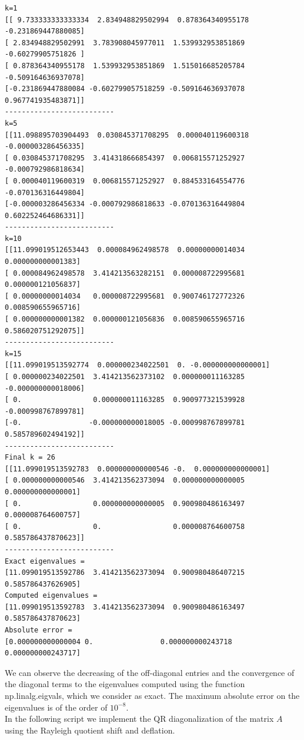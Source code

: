 \documentclass[a4paper,11pt]{article}
\begin{document}
\begin{verbatim}
k=1
[[ 9.733333333333334  2.834948829502994  0.878364340955178 -0.231869447880085]
[ 2.834948829502991  3.783908045977011  1.539932953851869 -0.60279905751826 ]
[ 0.878364340955178  1.539932953851869  1.515016685205784 -0.509164636937078]
[-0.231869447880084 -0.602799057518259 -0.509164636937078  0.967741935483871]]
--------------------------
k=5
[[11.098895703904493  0.030845371708295  0.000040119600318 -0.000003286456335]
[ 0.030845371708295  3.414318666854397  0.006815571252927 -0.000792986818634]
[ 0.000040119600319  0.006815571252927  0.884533164554776 -0.070136316449804]
[-0.000003286456334 -0.000792986818633 -0.070136316449804  0.602252464686331]]
--------------------------
k=10
[[11.099019512653443  0.000084962498578  0.00000000014034  0.000000000001383]
[ 0.000084962498578  3.414213563282151  0.000008722995681  0.000000121056837]
[ 0.00000000014034   0.000008722995681  0.900746172772326  0.008590655965716]
[ 0.000000000001382  0.000000121056836  0.008590655965716  0.586020751292075]]
--------------------------
k=15
[[11.099019513592774  0.000000234022501  0. -0.000000000000001]
[ 0.000000234022501  3.414213562373102  0.000000011163285 -0.000000000018006]
[ 0.                 0.000000011163285  0.900977321539928 -0.000998767899781]
[-0.                -0.000000000018005 -0.000998767899781  0.585789602494192]]
--------------------------
Final k = 26
[[11.099019513592783  0.000000000000546 -0.  0.000000000000001]
[ 0.000000000000546  3.414213562373094  0.000000000000005  0.000000000000001]
[ 0.                 0.000000000000005  0.900980486163497  0.000008764600757]
[ 0.                 0.                 0.000008764600758  0.585786437870623]]
--------------------------
Exact eigenvalues = 
[11.099019513592786  3.414213562373094  0.900980486407215  0.585786437626905]
Computed eigenvalues =
[11.099019513592783  3.414213562373094  0.900980486163497  0.585786437870623]
Absolute error =
[0.000000000000004 0.                0.000000000243718 0.000000000243717]
\end{verbatim}

\noindent We can observe the decreasing of the off-diagonal entries and the convergence of the diagonal terms to the eigenvalues computed using the function np.linalg.eigvals, which we consider as exact. The maximum absolute error on the eigenvalues is of the order of $10^{-8}$.\\

\noindent In the following script we implement the QR diagonalization of the matrix $A$ using the Rayleigh quotient shift and deflation. \\
\end{document}

